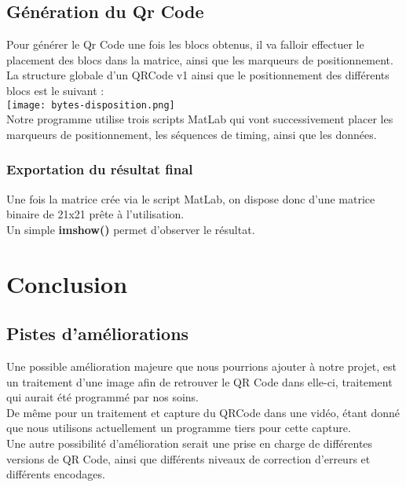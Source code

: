 \documentclass{report}
\begin{document}
	\section{Génération du Qr Code}

		Pour générer le Qr Code une fois les blocs obtenus, il va falloir effectuer le placement des blocs dans la matrice, ainsi que les marqueurs de positionnement.\\

		La structure globale d'un QRCode v1 ainsi que le positionnement des différents blocs est le suivant : \\

		\texttt{[image: bytes-disposition.png]}\\

		Notre programme utilise trois scripts MatLab qui vont successivement placer les marqueurs de positionnement, les séquences de timing, ainsi que les données.\\

		\subsection{Exportation du résultat final}

			Une fois la matrice crée via le script MatLab, on dispose donc d'une matrice binaire de 21x21 prête à l'utilisation.\\

			Un simple \textbf{imshow()} permet d'observer le résultat.\\

\chapter{Conclusion}

	\section{Pistes d'améliorations}

		Une possible amélioration majeure que nous pourrions ajouter à notre projet, est un traitement d'une image afin de retrouver le QR Code dans elle-ci, traitement qui aurait été programmé par nos soins.\\
		De même pour un traitement et capture du QRCode dans une vidéo, étant donné que nous utilisons actuellement un programme tiers pour cette capture.\\

		Une autre possibilité d'amélioration serait une prise en charge de différentes versions de QR Code, ainsi que différents niveaux de correction d'erreurs et différents encodages.\\
\end{document}
